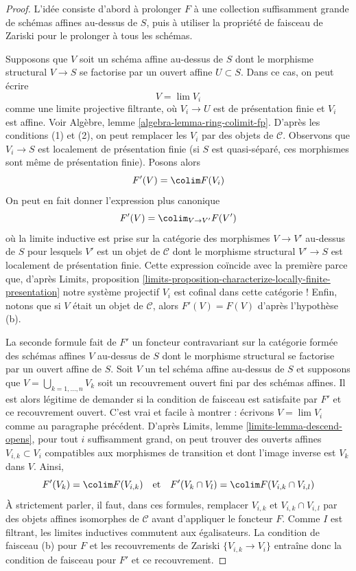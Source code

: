 \begin{proof}
L'idée consiste d'abord à prolonger $F$ à une collection suffisamment grande de
schémas affines au-dessus de $S$, puis à utiliser la propriété de faisceau de Zariski pour le prolonger
à tous les schémas.

\medskip\noindent
Supposons que $V$ soit un schéma affine au-dessus de $S$ dont le morphisme structural
$V \to S$ se factorise par un ouvert affine $U \subset S$. Dans ce cas,
on peut écrire
$$
V = \lim V_i
$$
comme une limite projective filtrante, où $V_i \to U$ est de présentation finie
et $V_i$ est affine. Voir Algèbre, lemme \ref{algebra-lemma-ring-colimit-fp}.
D'après les conditions (1) et (2),
on peut remplacer les $V_i$ par des objets de $\mathcal{C}$.
Observons que $V_i \to S$ est localement de présentation finie
(si $S$ est quasi-séparé, ces morphismes sont même
de présentation finie). Posons alors
$$
F'(V) = \colim F(V_i)
$$
On peut en fait donner l'expression plus canonique
$$
F'(V) = \colim_{V \to V'} F(V')
$$
où la limite inductive est prise sur la catégorie des morphismes $V \to V'$ au-dessus de $S$
pour lesquels $V'$ est un objet de $\mathcal{C}$ dont le morphisme
structural $V' \to S$ est localement de présentation finie.
Cette expression coïncide avec la première parce que, d'après
Limits, proposition
\ref{limits-proposition-characterize-locally-finite-presentation}
notre système projectif $V_i$ est cofinal dans cette catégorie !
Enfin, notons que si $V$ était un objet de $\mathcal{C}$,
alors $F'(V) = F(V)$ d'après l'hypothèse (b).

\medskip\noindent
La seconde formule fait de $F'$ un foncteur contravariant
sur la catégorie formée des schémas affines $V$ au-dessus de $S$ dont le
morphisme structural se factorise par un ouvert affine de $S$.
Soit $V$ un tel schéma affine au-dessus de $S$ et
supposons que $V = \bigcup_{k = 1, \ldots, n} V_k$ soit un recouvrement ouvert fini
par des schémas affines. Il est alors légitime de demander si la condition de faisceau
est satisfaite par $F'$ et ce recouvrement ouvert.
C'est vrai et facile à montrer : écrivons $V = \lim V_i$ comme au
paragraphe précédent. D'après Limits, lemme \ref{limits-lemma-descend-opens},
pour tout $i$ suffisamment grand, on peut trouver des ouverts affines
$V_{i, k} \subset V_i$ compatibles aux morphismes de transition
et dont l'image inverse est $V_k$ dans $V$. Ainsi,
$$
F'(V_k) = \colim F(V_{i, k})
\quad\text{et}\quad
F'(V_k \cap V_l) = \colim F(V_{i, k} \cap V_{i, l})
$$
À strictement parler, il faut, dans ces formules, remplacer $V_{i, k}$ et
$V_{i, k} \cap V_{i, l}$ par des objets affines isomorphes de $\mathcal{C}$
avant d'appliquer le foncteur $F$.
Comme $I$ est filtrant, les limites inductives commutent aux égalisateurs.
La condition de faisceau (b) pour $F$ et les recouvrements de Zariski
$\{V_{i, k} \to V_i\}$ entraîne donc la condition de
faisceau pour $F'$ et ce recouvrement.


\end{proof}
